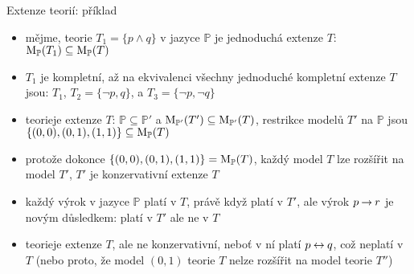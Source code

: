 \documentclass{beamer}
\begin{document}
\begin{frame}{Extenze teorií: příklad}
\small
\begin{itemize}
    \item mějme, teorie $T_1=\{p\land q\}$ v jazyce $\mathbb P$ je jednoduchá extenze $T$: $\operatorname{M}_\mathbb P(T_1)\subseteq\operatorname{M}_\mathbb P(T)$
    \item $T_1$ je kompletní, až na ekvivalenci všechny jednoduché kompletní extenze $T$ jsou: $T_1$, $T_2=\{\neg p,q\}$, a $T_3=\{\neg p,\neg q\}$
    \item teorieje extenze $T$: $\mathbb P\subseteq\mathbb P'$ a $\operatorname{M}_{\mathbb P'}(T')\subseteq\operatorname{M}_{\mathbb P'}(T)$, restrikce modelů $T'$ na $\mathbb P$ jsou  $\{(0,0),(0,1),(1,1)\}\subseteq\operatorname{M}_\mathbb P(T)$
    
    \item protože dokonce $\{(0,0),(0,1),(1,1)\}=\operatorname{M}_\mathbb P(T)$, každý model $T$ lze rozšířit na model $T'$, $T'$ je konzervativní extenze $T$
    \item každý výrok v jazyce $\mathbb P$ platí v $T$, právě když platí v $T'$, ale výrok $p\mathbin{\rightarrow} r$ je novým důsledkem: platí v $T'$ ale ne v $T$
    \item teorieje extenze $T$, ale ne konzervativní, neboť v ní platí $p\mathbin{\leftrightarrow} q$, což neplatí v $T$ (nebo proto, že model $(0, 1)$ teorie $T$ nelze rozšířit na model teorie $T''$)
\end{itemize}
 
\end{frame}
\end{document}
